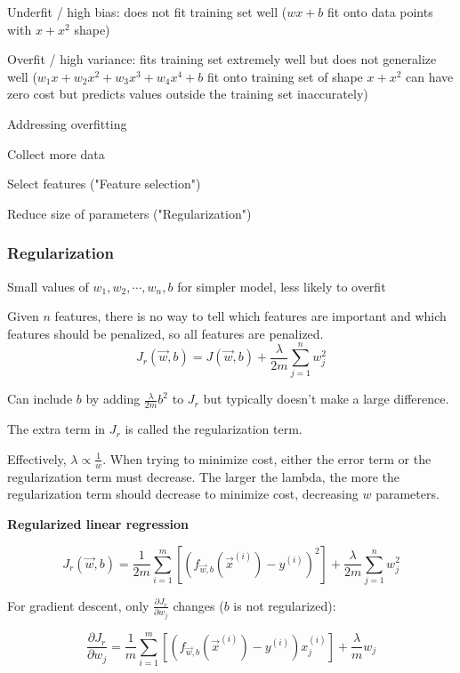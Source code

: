\documentclass[12pt]{article}
\begin{document}
Underfit / high bias: does not fit training set well ($wx + b$ fit onto data points with $x + x^2$ shape)

Overfit / high variance: fits training set extremely well but does not generalize well ($w_1 x + w_2 x^2 + w_3 x^3 + w_4 x^4 + b$ fit onto training set of shape $x + x^2$ can have zero cost but predicts values outside the training set inaccurately)

\vspace{5px}

Addressing overfitting
\begin{myitemize}
	\item Collect more data
	\item Select features ("Feature selection")
	\item Reduce size of parameters ("Regularization")
\end{myitemize}

\subsubsection{Regularization}

Small values of $w_1,w_2,\cdots,w_n,b$ for simpler model, less likely to overfit

Given $n$ features, there is no way to tell which features are important and which features should be penalized, so all features are penalized.
\[ J_r(\vec{w},b) = J(\vec{w},b) + \frac{\lambda}{2m} \sum_{j=1}^n w_j^2 \]

Can include $b$ by adding $\frac{\lambda}{2m} b^2$ to $J_r$ but typically doesn't make a large difference.

The extra term in $J_r$ is called the regularization term.

Effectively, $\lambda \propto \frac{1}{w}$. When trying to minimize cost, either the error term or the regularization term must decrease. The larger the lambda, the more the regularization term should decrease to minimize cost, decreasing $w$ parameters.

\noindent \textbf{Regularized linear regression}

\[ J_r(\vec{w},b) = \frac{1}{2m} \sum_{i=1}^m \left[(f_{\vec{w},b}(\vec{x}^{(i)}) - y^{(i)})^2\right] + \frac{\lambda}{2m} \sum_{j=1}^n w_j^2 \]

For gradient descent, only $\frac{\partial J_r}{\partial w_j}$ changes ($b$ is not regularized):

\[ \frac{\partial J_r}{\partial w_j} = \frac{1}{m} \sum_{i=1}^m \left[(f_{\vec{w},b}(\vec{x}^{(i)}) - y^{(i)})x_j^{(i)}\right] + \frac{\lambda}{m} w_j \]
\end{document}
